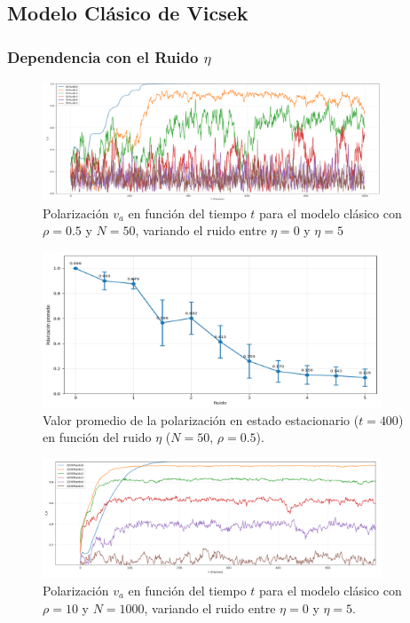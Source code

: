 \documentclass{article}
\begin{document}
\subsection{Modelo Clásico de Vicsek}

\subsubsection{Dependencia con el Ruido $\eta$}
\begin{figure}[H]
\centering
\includegraphics[width=0.9\textwidth]{polarizacion_vs_ruido_promedio.png}
\caption{Polarización $v_a$ en función del tiempo $t$ para el modelo clásico con $\rho = 0.5$ y $N = 50$, variando el ruido entre $\eta = 0$ y $\eta = 5$ }
\label{fig:va_vs_eta_promedio}
\end{figure}

\begin{figure}[H]
\centering
\includegraphics[width=0.9\textwidth]{polarizacion_vs_ruido_promedio2.png}
\caption{Valor promedio de la polarización en estado estacionario ($t=400$) en función del ruido $\eta$ ($N = 50$, $\rho = 0.5$).}
\label{fig:promedio_va_eta_promedio}
\end{figure}

\begin{figure}[H]
\centering
\includegraphics[width=0.9\textwidth]{promedio_polarizacion_ruido_promedio.png}
\caption{Polarización $v_a$ en función del tiempo $t$ para el modelo clásico con $\rho = 10$ y $N = 1000$, variando el ruido entre $\eta = 0$ y $\eta = 5$.}
\label{fig:va_vs_eta_promedio2}
\end{figure}
\end{document}
